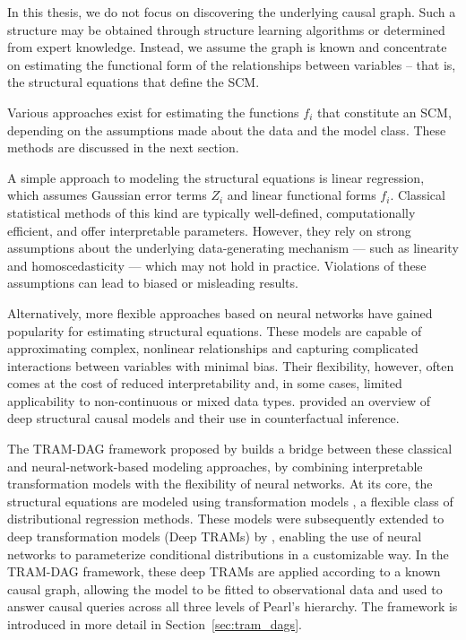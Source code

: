 In this thesis, we do not focus on discovering the underlying causal graph. Such a structure may be obtained through structure learning algorithms or determined from expert knowledge. Instead, we assume the graph is known and concentrate on estimating the functional form of the relationships between variables -- that is, the structural equations that define the SCM.

Various approaches exist for estimating the functions $f_i$ that constitute an SCM, depending on the assumptions made about the data and the model class. These methods are discussed in the next section.




%


A simple approach to modeling the structural equations is linear regression, which assumes Gaussian error terms $Z_i$ and linear functional forms $f_i$. Classical statistical methods of this kind are typically well-defined, computationally efficient, and offer interpretable parameters. However, they rely on strong assumptions about the underlying data-generating mechanism --- such as linearity and homoscedasticity --- which may not hold in practice. Violations of these assumptions can lead to biased or misleading results.

Alternatively, more flexible approaches based on neural networks have gained popularity for estimating structural equations. These models are capable of approximating complex, nonlinear relationships and capturing complicated interactions between variables with minimal bias. Their flexibility, however, often comes at the cost of reduced interpretability and, in some cases, limited applicability to non-continuous or mixed data types. \citet{poinsot2024} provided an overview of deep structural causal models and their use in counterfactual inference.

The TRAM-DAG framework proposed by \citet{sick2025} builds a bridge between these classical and neural-network-based modeling approaches, by combining interpretable transformation models with the flexibility of neural networks. At its core, the structural equations are modeled using transformation models \citep{hothorn2014}, a flexible class of distributional regression methods. These models were subsequently extended to deep transformation models (Deep TRAMs) by \citet{sick2020}, enabling the use of neural networks to parameterize conditional distributions in a customizable way. In the TRAM-DAG framework, these deep TRAMs are applied according to a known causal graph, allowing the model to be fitted to observational data and used to answer causal queries across all three levels of Pearl's hierarchy. The framework is introduced in more detail in Section~\ref{sec:tram_dags}.





